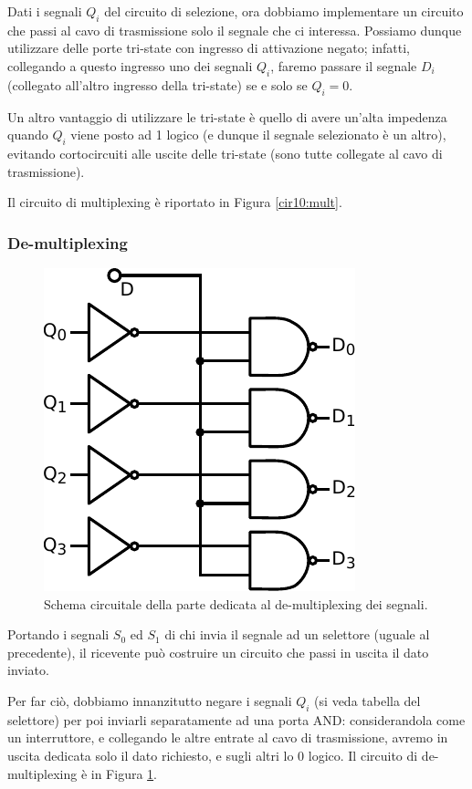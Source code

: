 Dati i segnali $Q_i$ del circuito di selezione, ora dobbiamo implementare un circuito che passi al cavo di trasmissione solo il segnale che ci interessa.
Possiamo dunque utilizzare delle porte tri-state con ingresso di attivazione negato; infatti, collegando a questo ingresso uno dei segnali $Q_i$, faremo passare il segnale $D_i$ (collegato all'altro ingresso della tri-state) se e solo se $Q_i=0$.

Un altro vantaggio di utilizzare le tri-state è quello di avere un'alta impedenza quando $Q_i$ viene posto ad 1 logico (e dunque il segnale selezionato è un altro), evitando cortocircuiti alle uscite delle tri-state (sono tutte collegate al cavo di trasmissione).

Il circuito di multiplexing è riportato in Figura \ref{cir10:mult}.

\subsubsection{De-multiplexing}

\begin{figure}
\centering
\includegraphics[width=.25\textwidth]{../E10/latex/demult.pdf}
\caption{Schema circuitale della parte dedicata al de-multiplexing dei segnali.}
\label{cir10:demult}
\end{figure}

Portando i segnali $S_0$ ed $S_1$ di chi invia il segnale ad un selettore (uguale al precedente), il ricevente può costruire un circuito che passi in uscita il dato inviato.

Per far ciò, dobbiamo innanzitutto negare i segnali $Q_i$ (si veda tabella del selettore) per poi inviarli separatamente ad una porta AND: considerandola come un interruttore, e collegando le altre entrate al cavo di trasmissione, avremo in uscita dedicata solo il dato richiesto, e sugli altri lo 0 logico.
Il circuito di de-multiplexing è in Figura \ref{cir10:demult}.
